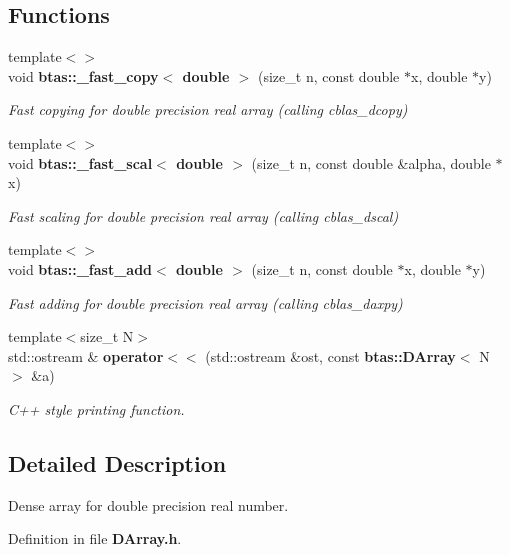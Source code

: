 \subsection*{Functions}
\begin{DoxyCompactItemize}
\item 
{\footnotesize template$<$$>$ }\\void {\bf btas\-::\-\_\-fast\-\_\-copy$<$ double $>$} (size\-\_\-t n, const double $\ast$x, double $\ast$y)
\begin{DoxyCompactList}\small\item\em Fast copying for double precision real array (calling cblas\-\_\-dcopy) \end{DoxyCompactList}\item 
{\footnotesize template$<$$>$ }\\void {\bf btas\-::\-\_\-fast\-\_\-scal$<$ double $>$} (size\-\_\-t n, const double \&alpha, double $\ast$x)
\begin{DoxyCompactList}\small\item\em Fast scaling for double precision real array (calling cblas\-\_\-dscal) \end{DoxyCompactList}\item 
{\footnotesize template$<$$>$ }\\void {\bf btas\-::\-\_\-fast\-\_\-add$<$ double $>$} (size\-\_\-t n, const double $\ast$x, double $\ast$y)
\begin{DoxyCompactList}\small\item\em Fast adding for double precision real array (calling cblas\-\_\-daxpy) \end{DoxyCompactList}\item 
{\footnotesize template$<$size\-\_\-t N$>$ }\\std\-::ostream \& {\bf operator$<$$<$} (std\-::ostream \&ost, const {\bf btas\-::\-D\-Array}$<$ N $>$ \&a)
\begin{DoxyCompactList}\small\item\em C++ style printing function. \end{DoxyCompactList}\end{DoxyCompactItemize}


\subsection{Detailed Description}
Dense array for double precision real number. 

Definition in file {\bf D\-Array.\-h}.



